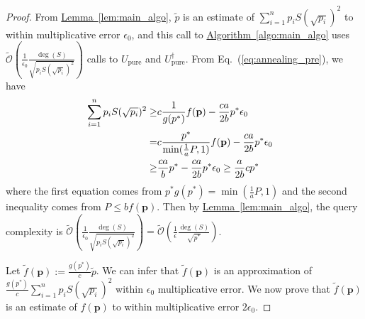 \documentclass[journal]{IEEEtran}
\newcommand{\eq}[1]{Eq.~(\ref{eq:#1})}
\newcommand{\lem}[1]{\hyperref[lem:#1]{Lemma~\ref*{lem:#1}}}
\newcommand{\algo}[1]{\hyperref[algo:#1]{Algorithm~\ref*{algo:#1}}}
\newcommand{\xzw}[1]{{\color{blue}{Xinzhao: \textbf{#1}}}}
\newcommand{\syzn}[1]{{\color{violet}{#1}}}
\begin{document}
\begin{proof}
From \lem{main_algo}, $\tilde{p}$ is an estimate of $\sum_{i=1}^n p_i S(\sqrt{p_i})^2$ to within multiplicative error $\epsilon_0$, and this call to \algo{main_algo} uses $\widetilde{\mathcal{O}}\left(\frac{1}{\epsilon_0}\frac{\deg(S)}{\sqrt{p_i S(\sqrt{p_i})^2}}\right)$ calls to $U_{\mathrm{pure}}$ and $U_{\mathrm{pure}}^{\dagger}$. From \eq{annealing_pre}, we have
\begin{align}
\label{eq:bound_q_S_q}
\hspace{-3mm}
    \sum_{i=1}^n p_i S(\sqrt{p_i})^2 \ge& c\frac{1}{g(p^*)} f(\mathbf{p}) - \frac{ca}{2b} p^* \epsilon_0   \nonumber \\=& c\frac{p^*}{\min(\frac{1}{a}P,1)} f(\mathbf{p}) -\frac{ca}{2b} p^* \epsilon_0 \nonumber \\  \ge& \frac{ca}{b}p^*- \frac{ca}{2b} p^*\epsilon_0\ge \frac{a}{2b}cp^*
\end{align}
where the first equation comes from $p^* g(p^*) = \min(\frac{1}{a} P, 1)$ and the second inequality comes from $P \le b f(\mathbf{p})$.%
Then by \lem{main_algo}, the query complexity is $\widetilde{\mathcal{O}}\left(\frac{1}{\epsilon_0}\frac{\deg(S)}{\sqrt{p_i S(\sqrt{p_i})^2}}\right) = \widetilde{\mathcal{O}}\left(\frac{1}{\epsilon} \frac{\deg(S)}{\sqrt{p^*}}\right)$.


Let $\tilde{f}(\mathbf{p}):=\frac{g(p^*)}{c}\tilde{p}$. We can infer that $\tilde{f}(\mathbf{p})$ is an approximation of $\frac{g(p^*)}{c}\sum_{i=1}^n p_i S(\sqrt{p_i})^2$ within $\epsilon_0$ multiplicative error. We now prove that $\tilde{f}(\mathbf{p})$ is an estimate of $f(\mathbf{p})$ to within multiplicative error $2\epsilon_0$.


\end{proof}
\end{document}
